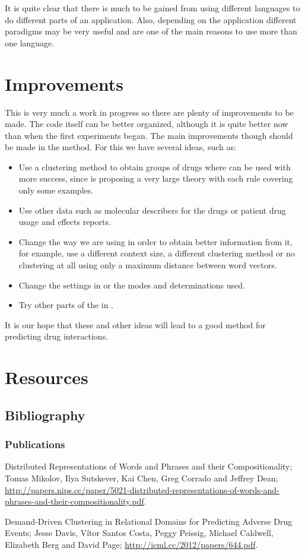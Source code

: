 \documentclass[12pt, openany]{book}
\begin{document}
It is quite clear that there is much to be gained from using different languages to do different parts of an application. Also, depending on the application different paradigms may be very useful and are one of the main reasons to use more than one language.

\chapter{Improvements}

This is very much a work in progress so there are plenty of improvements to be made. The code itself can be better organized, although it is quite better now than when the first experiments began. The main improvements though should be made in the method. For this we have several ideas, such as:
\begin{itemize}
	\item Use a clustering method to obtain groups of drugs where \alephilp can be used with more success, since \alephilp is proposing a very large theory with each rule covering only some examples.
	\item Use other data such as molecular describers for the drugs or patient drug usage and effects reports.
	\item Change the way we are using \wordvec in order to obtain better information from it, for example, use a different context size, a different clustering method or no clustering at all using only a maximum distance between word vectors.
	\item Change the settings in \alephilp or the modes and determinations used.
	\item Try other parts of the \xml in \alephilp.
\end{itemize}
It is our hope that these and other ideas will lead to a good method for predicting drug interactions.

\chapter{Resources}
\section{Bibliography}
\subsection{Publications}
\begin{description}
\item Distributed Representations of Words and Phrases and their Compositionality; Tomas Mikolov, Ilya Sutskever, Kai Chen, Greg Corrado and Jeffrey Dean; \url{http://papers.nips.cc/paper/5021-distributed-representations-of-words-and-phrases-}\linebreak\url{and-their-compositionality.pdf}.
\item Demand-Driven Clustering in Relational Domains for Predicting Adverse Drug Events; Jesse Davis, V\'itor Santos Costa, Peggy Peissig, Michael Caldwell, Elizabeth Berg and David Page; \url{http://icml.cc/2012/papers/644.pdf}.

\end{description}
\end{document}
